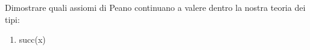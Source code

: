 Dimostrare quali assiomi di Peano continuano a valere dentro la nostra teoria dei tipi:
\begin{center}
\begin{enumerate}[label=$\textbf{Ax\arabic*}$. \textbf{pf} $\in$)]
    \item succ(x)
\end{enumerate}
\end{center}